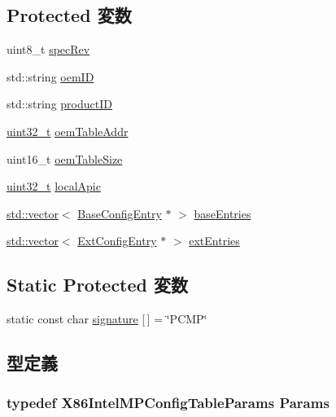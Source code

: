 \subsection*{Protected 変数}
\begin{DoxyCompactItemize}
\item 
uint8\_\-t \hyperlink{classX86ISA_1_1IntelMP_1_1ConfigTable_a56f76c52b1f369ed1502d8ed9d6e4027}{specRev}
\item 
std::string \hyperlink{classX86ISA_1_1IntelMP_1_1ConfigTable_a6fbe7411ccf0e5a919c00e383ebc634b}{oemID}
\item 
std::string \hyperlink{classX86ISA_1_1IntelMP_1_1ConfigTable_a3a17e46e3a6f431c55529f16eaf45d70}{productID}
\item 
\hyperlink{Type_8hh_a435d1572bf3f880d55459d9805097f62}{uint32\_\-t} \hyperlink{classX86ISA_1_1IntelMP_1_1ConfigTable_a8b34961e646041a75a6ad8d323db17ac}{oemTableAddr}
\item 
uint16\_\-t \hyperlink{classX86ISA_1_1IntelMP_1_1ConfigTable_ad02b7fcd77f20f9809a1ee7e59392965}{oemTableSize}
\item 
\hyperlink{Type_8hh_a435d1572bf3f880d55459d9805097f62}{uint32\_\-t} \hyperlink{classX86ISA_1_1IntelMP_1_1ConfigTable_ac8bddbc71325476c652c2dc9aeb6f6d1}{localApic}
\item 
\hyperlink{classstd_1_1vector}{std::vector}$<$ \hyperlink{classX86ISA_1_1IntelMP_1_1BaseConfigEntry}{BaseConfigEntry} $\ast$ $>$ \hyperlink{classX86ISA_1_1IntelMP_1_1ConfigTable_af709e8706bcc62bfc057f51ecc6f0bb7}{baseEntries}
\item 
\hyperlink{classstd_1_1vector}{std::vector}$<$ \hyperlink{classX86ISA_1_1IntelMP_1_1ExtConfigEntry}{ExtConfigEntry} $\ast$ $>$ \hyperlink{classX86ISA_1_1IntelMP_1_1ConfigTable_a5b2cb1d973eacb380ad6711db808c14c}{extEntries}
\end{DoxyCompactItemize}
\subsection*{Static Protected 変数}
\begin{DoxyCompactItemize}
\item 
static const char \hyperlink{classX86ISA_1_1IntelMP_1_1ConfigTable_a0a2d9cdd770f9baaf77aee1519540efa}{signature} \mbox{[}$\,$\mbox{]} = \char`\"{}PCMP\char`\"{}
\end{DoxyCompactItemize}


\subsection{型定義}
\hypertarget{classX86ISA_1_1IntelMP_1_1ConfigTable_a81c2fec34671b0bd0fbd621940d92d0e}{
\subsubsection[{Params}]{\setlength{\rightskip}{0pt plus 5cm}typedef X86IntelMPConfigTableParams {\bf Params}}}
\label{classX86ISA_1_1IntelMP_1_1ConfigTable_a81c2fec34671b0bd0fbd621940d92d0e}


